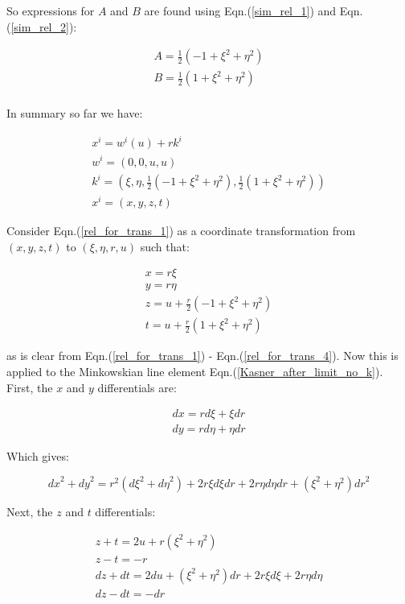 \noindent So expressions for $A$ and $B$ are found using Eqn.(\ref{sim_rel_1}) and Eqn.(\ref{sim_rel_2}):

\begin{eqnarray*}
A = \frac{1}{2} (-1 + \xi^2 + \eta^2) \\
B = \frac{1}{2} (1 + \xi^2 + \eta^2) \\
\end{eqnarray*}

In summary so far we have:

\begin{eqnarray}
x^i = w^i (u) + r k^i \label{rel_for_trans_1}\\
w^i = (0,0, u,u) \label{rel_for_trans_2}\\
k^i = (\xi, \eta, \frac{1}{2} (-1 + \xi^2 + \eta^2), \frac{1}{2} (1 + \xi^2 + \eta^2)) \label{rel_for_trans_3}\\
x^i = (x, y, z, t) \label{rel_for_trans_4}  
\end{eqnarray}

Consider Eqn.(\ref{rel_for_trans_1}) as a coordinate transformation from $(x,y,z,t)$ to $(\xi,\eta, r, u )$ such that:

\begin{eqnarray*} 
x = r \xi \\
y = r \eta \\
z = u + \frac{r}{2} (-1 + \xi^2 + \eta^2) \\
t = u + \frac{r}{2} (1 + \xi^2 + \eta^2)
\end{eqnarray*} 

\noindent as is clear from Eqn.(\ref{rel_for_trans_1}) - Eqn.(\ref{rel_for_trans_4}). Now this is applied to the Minkowskian line element Eqn.(\ref{Kasner_after_limit_no_k}). First, the $x$ and $y$ differentials are:

\begin{eqnarray*} 
dx = r d\xi + \xi dr \\
dy = r d\eta + \eta dr 
\end{eqnarray*} 

\noindent Which gives:

\begin{equation}\label{differentials_1}
{dx}^2 + {dy}^2 = r^2 ({d\xi}^2 + {d\eta}^2) + 2 r \xi {d\xi} {dr} + 2 r \eta {d\eta}{dr} + (\xi^2 + \eta^2) {dr}^2
\end{equation}

\noindent Next, the $z$ and $t$ differentials:

\begin{eqnarray*}
z + t = 2 u + r (\xi^2 + \eta^2) \\
z - t = - r \\
{dz} + {dt} = 2 du + (\xi^2 + \eta^2) dr + 2 r \xi {d\xi} + 2 r \eta {d\eta} \\
{dz} - {dt} = - dr 
\end{eqnarray*}

